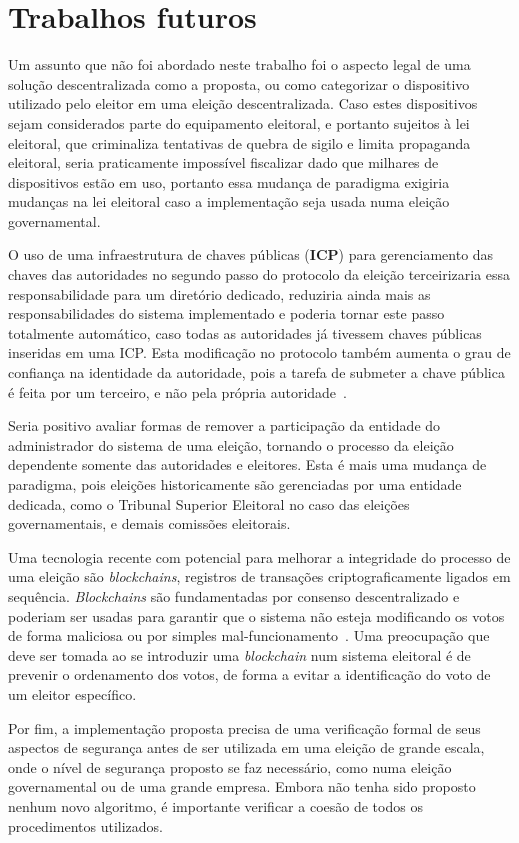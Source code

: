 \section{Trabalhos futuros}

Um assunto que não foi abordado neste trabalho foi o aspecto legal de uma
solução descentralizada como a proposta, ou como categorizar o dispositivo
utilizado pelo eleitor em uma eleição descentralizada. Caso estes dispositivos
sejam considerados parte do equipamento eleitoral, e portanto sujeitos à lei
eleitoral, que criminaliza tentativas de quebra de sigilo e limita propaganda
eleitoral, seria praticamente impossível fiscalizar dado que milhares de
dispositivos estão em uso, portanto essa mudança de paradigma exigiria mudanças
na lei eleitoral caso a implementação seja usada numa eleição governamental.

O uso de uma infraestrutura de chaves públicas (\textbf{ICP}) para
gerenciamento das chaves das autoridades no segundo passo do protocolo da
eleição terceirizaria essa responsabilidade para um diretório dedicado,
reduziria ainda mais as responsabilidades do sistema implementado e poderia
tornar este passo totalmente automático, caso todas as autoridades já tivessem
chaves públicas inseridas em uma ICP. Esta modificação no protocolo também
aumenta o grau de confiança na identidade da autoridade, pois a tarefa de
submeter a chave pública é feita por um terceiro, e não pela própria
autoridade~\cite{nash2001pki}.

Seria positivo avaliar formas de remover a participação da entidade do
administrador do sistema de uma eleição, tornando o processo da eleição
dependente somente das autoridades e eleitores. Esta é mais uma mudança de
paradigma, pois eleições historicamente são gerenciadas por uma entidade
dedicada, como o Tribunal Superior Eleitoral no caso das eleições
governamentais, e demais comissões eleitorais.

Uma tecnologia recente com potencial para melhorar a integridade do processo de
uma eleição são \textit{blockchains}, registros de transações
criptograficamente ligados em sequência. \textit{Blockchains} são fundamentadas
por consenso descentralizado e poderiam ser usadas para garantir que o sistema
não esteja modificando os votos de forma maliciosa ou por simples
mal-funcionamento~\cite{christidis2016blockchains}. Uma preocupação que deve
ser tomada ao se introduzir uma \textit{blockchain} num sistema eleitoral é de
prevenir o ordenamento dos votos, de forma a evitar a identificação do voto de
um eleitor específico.

Por fim, a implementação proposta precisa de uma verificação formal de seus
aspectos de segurança antes de ser utilizada em uma eleição de grande escala,
onde o nível de segurança proposto se faz necessário, como numa eleição
governamental ou de uma grande empresa. Embora não tenha sido proposto nenhum
novo algoritmo, é importante verificar a coesão de todos os procedimentos
utilizados.
